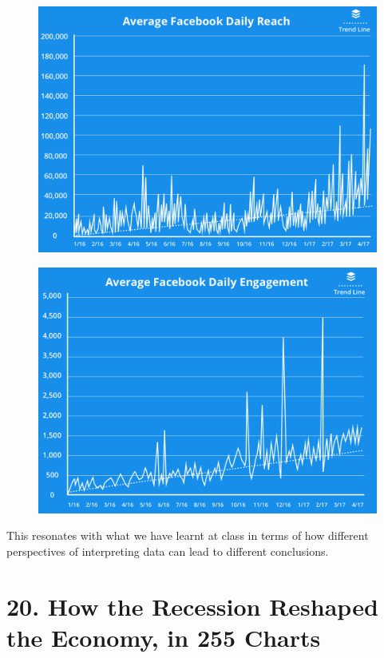 \documentclass[]{book}
\theoremstyle{definition}
\theoremstyle{definition}
\theoremstyle{definition}
\theoremstyle{remark}
\begin{document}
\begin{figure}
\centering
\includegraphics{images/average-facebook-reach.png}
\caption{}
\end{figure}

\begin{figure}
\centering
\includegraphics{images/average-facebook-daily-reach.png}
\caption{}
\end{figure}

This resonates with what we have learnt at class in terms of how
different perspectives of interpreting data can lead to different
conclusions.

\section{20. How the Recession Reshaped the Economy, in 255
Charts}\label{how-the-recession-reshaped-the-economy-in-255-charts}
\end{document}
